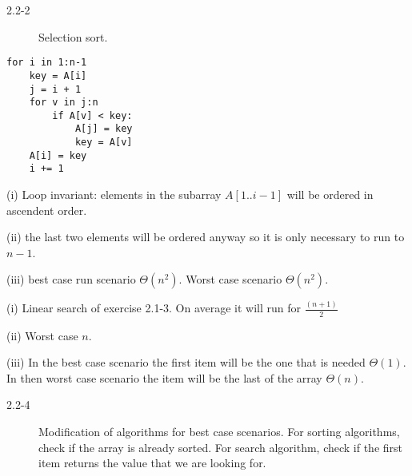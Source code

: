 \begin{description}
 \item[2.2-2] Selection sort.
\end{description}

\begin{lstlisting}
for i in 1:n-1
    key = A[i]
    j = i + 1
    for v in j:n
        if A[v] < key:
            A[j] = key
            key = A[v]
    A[i] = key
    i += 1
\end{lstlisting}

\begin{description}
 \item (i) Loop invariant: elements in the subarray $A[1..i-1]$ will be ordered in ascendent order.
 \item (ii) the last two elements will be ordered anyway so it is only necessary to run to $n-1$.
 \item (iii) best case run scenario $\Theta$$(n^2)$. Worst case scenario $\Theta$$(n^2)$.
\end{description}

\begin{description}
 \item[2.2-3] (i) Linear search of exercise 2.1-3. On average it will run for $\frac{(n+1)}{2}$
 \item (ii) Worst case $n$.
 \item (iii) In the best case scenario the first item will be the one that is needed $\Theta$$(1)$. In then
       worst case scenario the item will be the last of the array $\Theta$$(n)$.
\end{description}

\begin{description}
 \item[2.2-4] Modification of algorithms for best case scenarios. For sorting algorithms, check if the array
 is already sorted. For search algorithm, check if the first item returns the value that we are looking for.
\end{description}